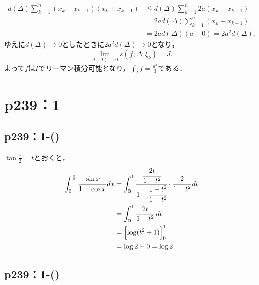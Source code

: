 \documentclass[a4paper,10pt,fleqn]{ltjsarticle}
\begin{document}
\begin{tleftbar}
    \begin{align*}
        d(\Delta) \sum_{k=1}^{n} (x_k - x_{k-1}) (x_k + x_{k-1}) & \leqq d(\Delta) \sum_{k=1}^{n} 2a (x_k - x_{k-1}) \\
                                                                 & = 2a d(\Delta) \sum_{k=1}^{n} (x_k - x_{k-1})     \\
                                                                 & = 2a d(\Delta) (a - 0) = 2a^2 d(\Delta).
    \end{align*}
    ゆえに$d (\Delta) \to 0$としたときに$2a^2 d(\Delta) \to 0$となり，
    \[
        \lim_{d(\Delta) \to 0} s(f;\Delta; \xi_k)=J.
    \]
    よって$f$は$I$でリーマン積分可能となり，$\int_{I} f = \frac{a^3}{3}$である．
\end{tleftbar}


\section*{p239：1}

\subsection*{p239：1-()}

\begin{screen}
    $\tan \frac{x}{2}=t$とおくと，
    \begin{align*}
        \int_{0}^{\frac{\pi}{2}} \cfrac{\sin x}{1+\cos x} \, dx & = \int_{0}^{1} \cfrac{\cfrac{2t}{1+t^2}}{1+\cfrac{1-t^2}{1+t^2}} \cdot \cfrac{2}{1+t^2} \, dt \\
                                                                & = \int_{0}^{1} \frac{2t}{1+t^2} \, dt                                                         \\
                                                                & = \Bigl[\log (t^2+1)\Bigl]_{0}^{1}                                                            \\
                                                                & = \log 2-0 = \log 2
    \end{align*}
\end{screen}


\subsection*{p239：1-()}
\end{document}
